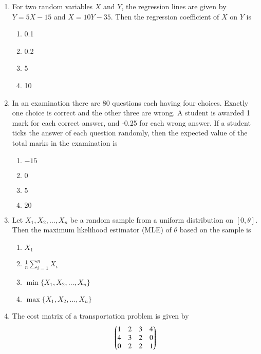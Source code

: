 \documentclass[journal]{IEEEtran}
\numberwithin{equation}{enumi}
\numberwithin{figure}{enumi}
\begin{document}
\begin{enumerate}
\item
For two random variables $X$ and $Y$, the regression lines are given by $Y = 5X - 15$ and $X = 10Y - 35$. Then the regression coefficient of $X$ on $Y$ is
\hfill{}
\begin{multicols}{4}
\begin{enumerate}
    \item 0.1
    \item 0.2
    \item 5
    \item 10
\end{enumerate}
\end{multicols}

\item
In an examination there are 80 questions each having four choices. Exactly one choice is correct and the other three are wrong. A student is awarded 1 mark for each correct answer, and -0.25 for each wrong answer. If a student ticks the answer of each question randomly, then the expected value of the total marks in the examination is
\hfill{}
\begin{multicols}{4}
\begin{enumerate}
    \item $-15$
    \item $0$
    \item $5$
    \item $20$
\end{enumerate}
\end{multicols}

\item
Let $X_1, X_2, \ldots, X_n$ be a random sample from a uniform distribution on $[0,\theta]$. Then the maximum likelihood estimator (MLE) of $\theta$ based on the sample is
\hfill{}
\begin{multicols}{4}
\begin{enumerate}
    \item $X_1$
    \item $\frac{1}{n} \sum_{i=1}^n X_i$
    \item $\min\{X_1, X_2, \ldots, X_n\}$
    \item $\max\{X_1, X_2, \ldots, X_n\}$
\end{enumerate}
\end{multicols}

\item
The cost matrix of a transportation problem is given by
\begin{align}
    \begin{pmatrix}
1 & 2 & 3 & 4 \\
4 & 3 & 2 & 0 \\
0 & 2 & 2 & 1
\end{pmatrix}
\end{align}



\end{enumerate}
\end{document}
